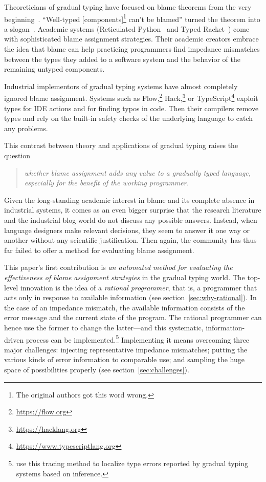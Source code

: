 
Theoreticians of gradual typing have focused on blame theorems from the very
beginning~\cite{mf-toplas-2009, tf-dls-2006}. ``Well-typed
[components]\footnote{The original authors got this word wrong.} can't be
blamed'' turned the theorem into a slogan~\cite{wf-esop-2009}. Academic systems
(Reticulated Python~\cite{vsc-dls-2019, vss-popl-2017, vksb-dls-2014} and Typed
Racket~\cite{tf-dls-2006,tf-popl-2008,tfffgksst-snapl-2017,tf-icfp-2010}) come
with sophisticated blame assignment strategies. Their academic creators embrace
the idea that blame can help practicing programmers find impedance mismatches
between the types they added to a software system and the behavior of the
remaining untyped components.

Industrial implementors of gradual typing systems have almost completely ignored
blame assignment.  Systems such as Flow,\footnote{\url{https://flow.org}}
Hack,\footnote{\url{https://hacklang.org}} or
TypeScript\footnote{\url{https://www.typescriptlang.org}} exploit types for IDE
actions and for finding typos in code. Then their compilers remove types and
rely on the built-in safety checks of the underlying language to catch any
problems.

This contrast between theory and applications of gradual typing raises the question 
\begin{quote}
 \it
 whether blame assignment adds any value to a gradually typed language,
 especially for the benefit of the working programmer.
\end{quote}
Given the long-standing academic interest in blame and its complete absence in
industrial systems, it comes as an even bigger surprise that the research
literature and the industrial blog world do not discuss any possible answers.
Instead, when language designers make relevant decisions, they seem to answer it
one way or another without any scientific justification. Then again, the
community has thus far failed to offer a method for evaluating blame assignment.

This paper's first contribution is {\em an automated method for evaluating the
effectiveness of blame assignment strategies\/} in the gradual typing world.
The top-level innovation is the idea of a {\em rational programmer\/}, that is,
a programmer that acts only in response to available information (see section~\ref{sec:why-rational}). In the case
of an impedance mismatch, the available information consists of the error
message and the current state of the program. The rational programmer can hence
use the former to change the latter---and this systematic, information-driven
process can be implemented.\footnote{\citet{cc-snapl-19} use this tracing
method to localize type errors reported by gradual typing systems based on
inference.} Implementing it means overcoming three major challenges: injecting
representative impedance mismatches; putting the various kinds of error
information to comparable use; and sampling the huge space of possibilities
properly (see section~\ref{sec:challenges}).

